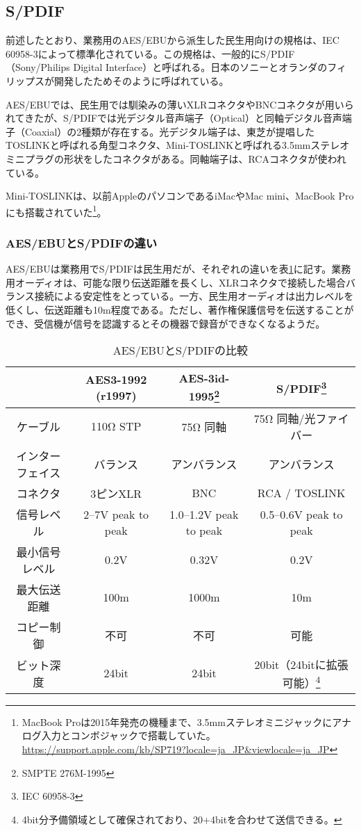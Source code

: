 \subsection{S/PDIF}

前述したとおり、業務用のAES/EBUから派生した民生用向けの規格は、IEC 60958-3によって標準化されている。この規格は、一般的にS/PDIF（Sony/Philips Digital Interface）と呼ばれる。日本のソニーとオランダのフィリップスが開発したためそのように呼ばれている。

AES/EBUでは、民生用では馴染みの薄いXLRコネクタやBNCコネクタが用いられてきたが、S/PDIFでは光デジタル音声端子（Optical）と同軸デジタル音声端子（Coaxial）の2種類が存在する。光デジタル端子は、東芝が提唱したTOSLINKと呼ばれる角型コネクタ、Mini-TOSLINKと呼ばれる3.5mmステレオミニプラグの形状をしたコネクタがある。同軸端子は、RCAコネクタが使われている。

Mini-TOSLINKは、以前AppleのパソコンであるiMacやMac mini、MacBook Proにも搭載されていた\footnote{MacBook Proは2015年発売の機種まで、3.5mmステレオミニジャックにアナログ入力とコンボジャックで搭載していた。 \url{https://support.apple.com/kb/SP719?locale=ja_JP&viewlocale=ja_JP}}。

\subsubsection{AES/EBUとS/PDIFの違い}

AES/EBUは業務用でS/PDIFは民生用だが、それぞれの違いを表\ref{tab:compare}に記す。業務用オーディオは、可能な限り伝送距離を長くし、XLRコネクタで接続した場合バランス接続による安定性をとっている。一方、民生用オーディオは出力レベルを低くし、伝送距離も10m程度である。ただし、著作権保護信号を伝送することができ、受信機が信号を認識するとその機器で録音ができなくなるようだ。

\begin{table}[htb]
  \begin{minipage}{\textwidth}
    \label{tab:compare}
    \caption{AES/EBUとS/PDIFの比較\cite{aesebuandspdif}}
    \begin{tabular}{c|ccc} \hline
      & AES3-1992 (r1997) & AES-3id-1995\footnote{SMPTE 276M-1995} & S/PDIF\footnote{IEC 60958-3} \\ \hline
      ケーブル & 110Ω STP & 75Ω 同軸 & 75Ω 同軸/光ファイバー \\
      インターフェイス & バランス & アンバランス & アンバランス \\
      コネクタ & 3ピンXLR & BNC & RCA / TOSLINK \\
      信号レベル & 2--7V peak to peak & 1.0--1.2V peak to peak & 0.5--0.6V peak to peak \\
      最小信号レベル & 0.2V & 0.32V & 0.2V \\
      最大伝送距離 & 100m & 1000m & 10m \\
      コピー制御 & 不可 & 不可 & 可能 \\
      ビット深度 & 24bit & 24bit & 20bit（24bitに拡張可能）\footnote{4bit分予備領域として確保されており、20+4bitを合わせて送信できる。} \\
    \end{tabular}
  \end{minipage}
\end{table}

